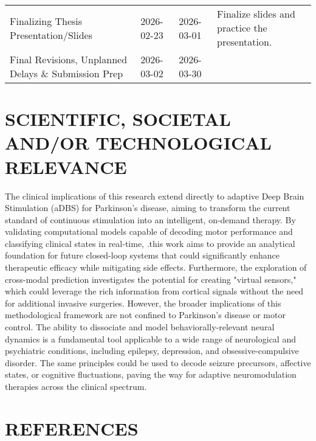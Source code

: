 \documentclass[12pt, a4paper]{article}
\begin{document}
\begin{table}[h!]
{\begin{tabularx}{\textwidth}{>{\RaggedRight}X l l >{\RaggedRight}X}
            Finalizing Thesis Presentation/Slides                & 2026-02-23          & 2026-03-01        & Finalize slides and practice the presentation.                                                                              \\

            Final Revisions, Unplanned Delays \& Submission Prep & 2026-03-02          & 2026-03-30        &                                                                                                                             \\
        \end{tabularx}
    }
\end{table}

\newpage

\section{SCIENTIFIC, SOCIETAL AND/OR TECHNOLOGICAL RELEVANCE}
The clinical implications of this research extend directly to adaptive Deep Brain Stimulation (aDBS) for Parkinson's disease, aiming to transform the current standard of continuous stimulation into an intelligent, on-demand therapy. By validating computational models capable of decoding motor performance and classifying clinical states in real-time, .this work aims to provide an analytical foundation for future closed-loop systems that could significantly enhance therapeutic efficacy while mitigating side effects. Furthermore, the exploration of cross-modal prediction investigates the potential for creating "virtual sensors," which could leverage the rich information from cortical signals without the need for additional invasive surgeries. However, the broader implications of this methodological framework are not confined to Parkinson's disease or motor control. The ability to dissociate and model behaviorally-relevant neural dynamics is a fundamental tool applicable to a wide range of neurological and psychiatric conditions, including epilepsy, depression, and obsessive-compulsive disorder. The same principles could be used to decode seizure precursors, affective states, or cognitive fluctuations, paving the way for adaptive neuromodulation therapies across the clinical spectrum.

\section{REFERENCES}
\printbibliography[heading=none]
\end{document}
